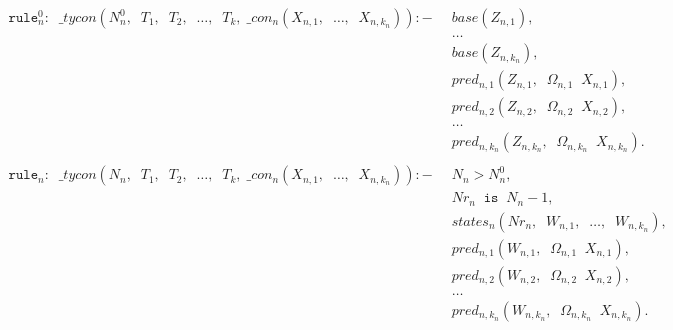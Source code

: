 \documentclass{report}
\theoremstyle{definition}
\theoremstyle{definition}
\newcommand{\ttt}[1]{\texttt{#1}}
\newcommand{\tav}{\;\;}
\begin{document}
	\begin{align*}
		\ttt{rule}_{n}^{0}: \tav \_ tycon (N_{n}^{0}, \tav T_1, \tav T_2, \tav \ldots, \tav T_k, \; \_ con_n(X_{n,1}, \tav \ldots, \tav X_{n,k_n})) :-
		  & \tav base(Z_{n,1}),                                                 &   &   \\
		  & \tav \ldots                                                         &   &   \\
		  & \tav base(Z_{n,k_n}),                                               &   &   \\
		  & \tav pred_{n, 1}(Z_{n,1}, \tav \Omega_{n, 1} \tav X_{n,1}),         &   &   \\
		  & \tav pred_{n, 2}(Z_{n,2}, \tav \Omega_{n, 2} \tav X_{n,2}),         &   &   \\
		  & \tav \ldots \tav                                                    &   &   \\
		  & \tav pred_{n, k_n}(Z_{n,k_n}, \tav \Omega_{n, k_n} \tav X_{n,k_n}). &   &   \\
		\\
		\ttt{rule}_n: \tav \_ tycon (N_n, \tav T_1, \tav T_2, \tav \ldots, \tav T_k, \; \_ con_n(X_{n,1}, \tav \ldots, \tav X_{n,k_n})) :-
		  & \tav N_n > N_{n}^{0},                                               &   &   \\
		  & \tav Nr_n \tav \ttt{is} \tav N_n - 1,                               &   &   \\
		  & \tav states_n(Nr_n, \tav W_{n,1}, \tav \ldots, \tav W_{n,k_n}),     &   &   \\
		  & \tav pred_{n, 1}(W_{n,1}, \tav \Omega_{n, 1} \tav X_{n,1}),         &   &   \\
		  & \tav pred_{n, 2}(W_{n,2}, \tav \Omega_{n, 2} \tav X_{n,2}),         &   &   \\
		  & \tav \ldots \tav                                                    &   &   \\
		  & \tav pred_{n, k_n}(W_{n,k_n}, \tav \Omega_{n, k_n} \tav X_{n,k_n}). &   &   \\
	\end{align*}\\
\end{document}
